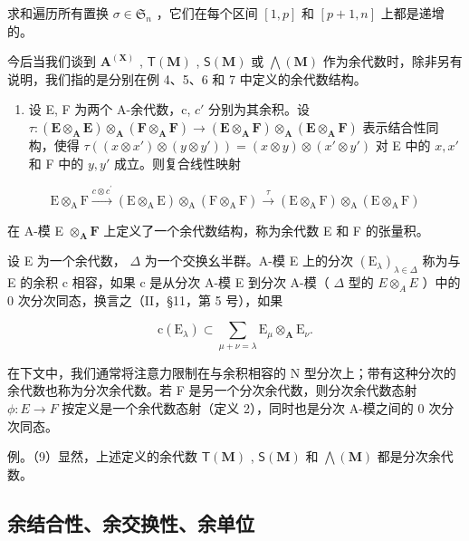 求和遍历所有置换 \(\sigma\in\mathfrak{S}_{n}\) ，它们在每个区间 \([1,p]\) 和 \([p+1,n]\) 上都是递增的。

今后当我们谈到 \(\mathbf{A}^{(\mathbf{X})}\) , \(\mathsf{T}(\mathbf{M})\) , \(\mathsf{S}(\mathbf{M})\) 或 \(\bigwedge (\mathbf{M})\) 作为余代数时，除非另有说明，我们指的是分别在例 4、5、6 和 7 中定义的余代数结构。

\begin{enumerate}
\def\labelenumi{(\arabic{enumi})}
\setcounter{enumi}{7}
\tightlist
\item
  设 E, F 为两个 A-余代数，c, \(c'\) 分别为其余积。设 \(\tau:(\mathbf{E} \otimes_{\mathbf{A}} \mathbf{E}) \otimes_{\mathbf{A}} (\mathbf{F} \otimes_{\mathbf{A}} \mathbf{F}) \to (\mathbf{E} \otimes_{\mathbf{A}} \mathbf{F}) \otimes_{\mathbf{A}} (\mathbf{E} \otimes_{\mathbf{A}} \mathbf{F})\) 表示结合性同构，使得 \(\tau((x \otimes x') \otimes (y \otimes y')) = (x \otimes y) \otimes (x' \otimes y')\) 对 E 中的 \(x, x'\) 和 F 中的 \(y, y'\) 成立。则复合线性映射
\end{enumerate}

\[
\mathrm{E} \otimes_ {\mathrm{A}} \mathrm{F} \xrightarrow {c \otimes c ^ {\prime}} (\mathrm{E} \otimes_ {\mathrm{A}} \mathrm{E}) \otimes_ {\mathrm{A}} (\mathrm{F} \otimes_ {\mathrm{A}} \mathrm{F}) \xrightarrow {\tau} (\mathrm{E} \otimes_ {\mathrm{A}} \mathrm{F}) \otimes_ {\mathrm{A}} (\mathrm{E} \otimes_ {\mathrm{A}} \mathrm{F})
\]

在 A-模 E \(\otimes_{\mathbf{A}}\mathbf{F}\) 上定义了一个余代数结构，称为余代数 E 和 F 的张量积。

设 E 为一个余代数， \(\Delta\) 为一个交换幺半群。A-模 E 上的分次 \((\mathrm{E}_{\lambda})_{\lambda\in\Delta}\) 称为与 E 的余积 c 相容，如果 c 是从分次 A-模 E 到分次 A-模（ \(\Delta\) 型的 \(E\otimes_{A}E\) ）中的 0 次分次同态，换言之（II，§11，第 5 号），如果

\[
\mathrm{c} (\mathrm{E} _ {\lambda}) \subset \sum_ {\mu + \nu = \lambda} \mathrm{E} _ {\mu} \otimes_ {\mathbf {A}} \mathrm{E} _ {\nu}.\tag{10}
\]

在下文中，我们通常将注意力限制在与余积相容的 N 型分次上；带有这种分次的余代数也称为分次余代数。若 F 是另一个分次余代数，则分次余代数态射 \(\phi:E\to F\) 按定义是一个余代数态射（定义 2），同时也是分次 A-模之间的 0 次分次同态。

例。（9）显然，上述定义的余代数 \(\mathsf{T}(\mathbf{M})\) , \(\mathsf{S}(\mathbf{M})\) 和 \(\bigwedge (\mathbf{M})\) 都是分次余代数。

\subsection{余结合性、余交换性、余单位}

